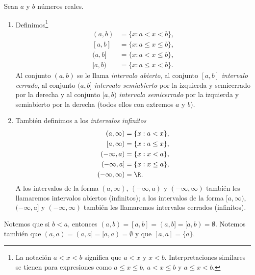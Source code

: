 \documentclass[12pt,a4paper]{book}
\begin{document}
    \begin{definicion}[Intervalos]\label{def:12}
        Sean $a$ y $b$ números reales.
        \begin{enumerate}
            \item Definimos\footnote{La notación $a<x<b$ significa que $a<x$ y $x<b$. Interpretaciones similares se tienen
            para expresiones como $a\leq x\leq b$, $a<x\leq b$ y $a\leq x<b$.}
            \begin{align*}
                (a,b)&=\{x:a<x<b\},\\
                [a,b]&=\{x:a\leq x\leq b\},\\
                (a,b]&=\{x:a<x\leq b\},\\
                [a,b)&=\{x:a\leq x<b\}.
            \end{align*}
            Al conjunto $(a,b)$ se le llama \textit{intervalo abierto}, al conjunto $[a,b]$ \textit{intervalo
            cerrado}, al conjunto $(a,b]$ \textit{intervalo semiabierto} por la izquierda y semicerrado
            por la derecha y al conjunto $[a,b)$ \textit{intervalo semicerrado} por la
            izquierda y semiabierto por la derecha (todos ellos con extremos $a$ y $b$).
            \item También definimos a los \textit{intervalos infinitos}
            \begin{align*}
                (a,\infty)&=\{x:a<x\},\\
                [a,\infty)&=\{x:a\leq x\},\\
                (-\infty,a)&=\{x:x<a\},\\
                (-\infty,a]&=\{x:x\leq a\},\\
                (-\infty,\infty)&=\R.
            \end{align*}
            A los intervalos de la forma $(a,\infty)$, $(-\infty,a)$ y $(-\infty,\infty)$ también les llamaremos
            intervalos abiertos (infinitos); a los intervalos de la forma $[a,\infty)$,
            $(-\infty,a]$ y $(-\infty,\infty)$ también les llamaremos intervalos cerrados (infinitos).
        \end{enumerate}
    \end{definicion}

    Notemos que si $b<a$, entonces $(a,b)=[a,b]=(a,b]=[a,b)=\emptyset$. Notemos
    también que $(a,a)=(a,a]=[a,a)=\emptyset$ y que $[a,a]=\{a\}$.
\end{document}
